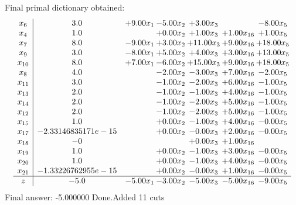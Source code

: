 \documentclass[8pt]{article}
\begin{document}
 Final primal dictionary obtained: 
\[\begin{array}{c| c c@{\hskip 2pt} c@{\hskip 2pt} c@{\hskip 2pt} c@{\hskip 2pt} c@{\hskip 2pt} }
 x_{6}   &  3.0 & +  9.00 x_{1} & -5.00 x_{2} & +  3.00 x_{3} &   & -8.00 x_{5}\\
 x_{4}   &  1.0  &   & +  0.00 x_{2} & +  1.00 x_{3} & +  1.00 x_{16} & +  1.00 x_{5}\\
 x_{7}   &  8.0 & -9.00 x_{1} & +  3.00 x_{2} & + 11.00 x_{3} & +  9.00 x_{16} & + 18.00 x_{5}\\
 x_{9}   &  3.0 & -8.00 x_{1} & +  5.00 x_{2} & +  4.00 x_{3} & +  3.00 x_{16} & + 13.00 x_{5}\\
 x_{10}   &  8.0 & +  7.00 x_{1} & -6.00 x_{2} & + 15.00 x_{3} & +  9.00 x_{16} & + 18.00 x_{5}\\
 x_{8}   &  4.0  &   & -2.00 x_{2} & -3.00 x_{3} & +  7.00 x_{16} & -2.00 x_{5}\\
 x_{11}   &  3.0  &   & -1.00 x_{2} & -2.00 x_{3} & +  6.00 x_{16} & -1.00 x_{5}\\
 x_{13}   &  2.0  &   & -1.00 x_{2} & -1.00 x_{3} & +  4.00 x_{16} & -1.00 x_{5}\\
 x_{14}   &  2.0  &   & -1.00 x_{2} & -2.00 x_{3} & +  5.00 x_{16} & -1.00 x_{5}\\
 x_{12}   &  2.0  &   & -1.00 x_{2} & -2.00 x_{3} & +  5.00 x_{16} & -1.00 x_{5}\\
 x_{15}   &  1.0  &   & +  0.00 x_{2} & -1.00 x_{3} & +  4.00 x_{16} & -0.00 x_{5}\\
 x_{17}   &  -2.33146835171e-15  &   & +  0.00 x_{2} & -0.00 x_{3} & +  2.00 x_{16} & -0.00 x_{5}\\
 x_{18}   &  -0  &    &   & +  0.00 x_{3} & +  1.00 x_{16} &   \\
 x_{19}   &  1.0  &   & +  0.00 x_{2} & -1.00 x_{3} & +  3.00 x_{16} & -0.00 x_{5}\\
 x_{20}   &  1.0  &   & +  0.00 x_{2} & -1.00 x_{3} & +  4.00 x_{16} & -0.00 x_{5}\\
 x_{21}   &  -1.33226762955e-15  &   & +  0.00 x_{2} & -0.00 x_{3} & +  1.00 x_{16} & -0.00 x_{5}\\
\hline
z    &  -5.0 & -5.00 x_{1} & -3.00 x_{2} & -5.00 x_{3} & -5.00 x_{16} & -9.00 x_{5}\\
\end{array}\]
 Final answer: -5.000000 
Done.Added 11 cuts 
\end{document}
